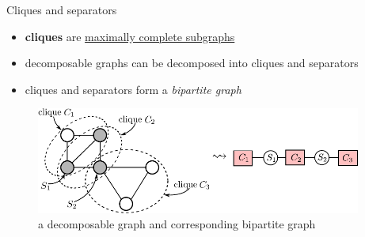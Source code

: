 \begin{frame} \frametitle{\secname}

	\begin{block}{Cliques and separators}
	\begin{itemize}
		\item \textbf{cliques} are \underline{maximally complete subgraphs}
		\item decomposable graphs can be decomposed into cliques and separators
		\item cliques and separators form a \emph{bipartite graph}
	\end{itemize}
	\end{block}
	
	\slidesonly{\vspace{4mm}}
	
	\begin{figure}[h]
	\centering
	\includegraphics[height=3.5cm]{img/section3_fig15}
	\caption{a decomposable graph and corresponding bipartite graph}
	\end{figure}
	
		
\end{frame}



